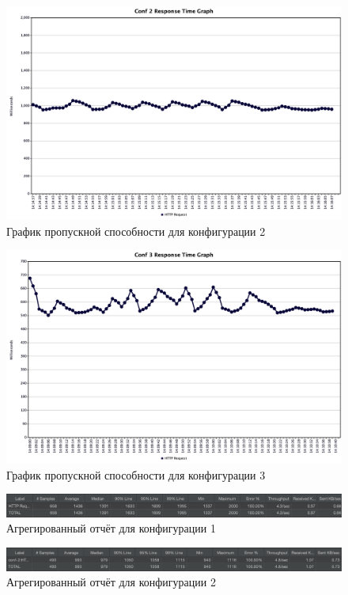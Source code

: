 \documentclass[12pt,onecolumn]{article}
\begin{document}
\begin{figure}[H]
  \includegraphics[width=\textwidth]{image/resp-graph-conf-2.png}
  \caption{График пропускной способности для конфигурации 2}
\end{figure}

\begin{figure}[H]
  \includegraphics[width=\textwidth]{image/resp-graph-conf-3.png}
  \caption{График пропускной способности для конфигурации 3}
\end{figure}

\begin{figure}[H]
  \includegraphics[width=\textwidth]{image/aggregate-report-conf1.png}
  \caption{Агрегированный отчёт для конфигурации 1}
\end{figure}

\begin{figure}[H]
  \includegraphics[width=\textwidth]{image/aggregate-report-conf2.png}
  \caption{Агрегированный отчёт для конфигурации 2}
\end{figure}
\end{document}
